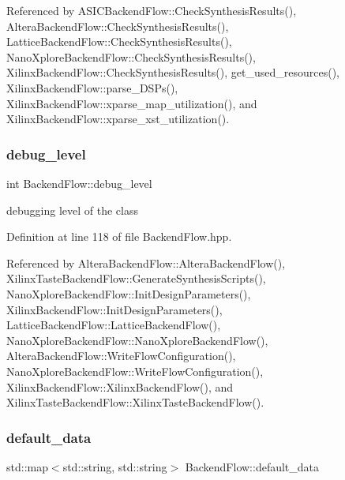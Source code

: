 Referenced by A\+S\+I\+C\+Backend\+Flow\+::\+Check\+Synthesis\+Results(), Altera\+Backend\+Flow\+::\+Check\+Synthesis\+Results(), Lattice\+Backend\+Flow\+::\+Check\+Synthesis\+Results(), Nano\+Xplore\+Backend\+Flow\+::\+Check\+Synthesis\+Results(), Xilinx\+Backend\+Flow\+::\+Check\+Synthesis\+Results(), get\+\_\+used\+\_\+resources(), Xilinx\+Backend\+Flow\+::parse\+\_\+\+D\+S\+Ps(), Xilinx\+Backend\+Flow\+::xparse\+\_\+map\+\_\+utilization(), and Xilinx\+Backend\+Flow\+::xparse\+\_\+xst\+\_\+utilization().

\mbox{\label{classBackendFlow_a51ab7bc0bb6080e902f55aeee1f04006}} 
\subsubsection{\texorpdfstring{debug\+\_\+level}{debug\_level}}
{\footnotesize\ttfamily int Backend\+Flow\+::debug\+\_\+level\hspace{0.3cm}{\ttfamily [protected]}}



debugging level of the class 



Definition at line 118 of file Backend\+Flow.\+hpp.



Referenced by Altera\+Backend\+Flow\+::\+Altera\+Backend\+Flow(), Xilinx\+Taste\+Backend\+Flow\+::\+Generate\+Synthesis\+Scripts(), Nano\+Xplore\+Backend\+Flow\+::\+Init\+Design\+Parameters(), Xilinx\+Backend\+Flow\+::\+Init\+Design\+Parameters(), Lattice\+Backend\+Flow\+::\+Lattice\+Backend\+Flow(), Nano\+Xplore\+Backend\+Flow\+::\+Nano\+Xplore\+Backend\+Flow(), Altera\+Backend\+Flow\+::\+Write\+Flow\+Configuration(), Nano\+Xplore\+Backend\+Flow\+::\+Write\+Flow\+Configuration(), Xilinx\+Backend\+Flow\+::\+Xilinx\+Backend\+Flow(), and Xilinx\+Taste\+Backend\+Flow\+::\+Xilinx\+Taste\+Backend\+Flow().

\mbox{\label{classBackendFlow_a39361aab80b7b193ed3c38122a8651cf}} 
\subsubsection{\texorpdfstring{default\+\_\+data}{default\_data}}
{\footnotesize\ttfamily std\+::map$<$std\+::string, std\+::string$>$ Backend\+Flow\+::default\+\_\+data\hspace{0.3cm}{\ttfamily [protected]}}



